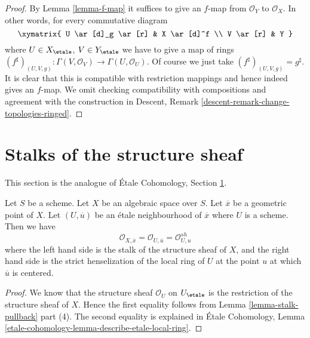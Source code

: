 \begin{proof}
By Lemma \ref{lemma-f-map} it suffices to give an $f$-map from
$\mathcal{O}_Y$ to $\mathcal{O}_X$. In other words, for every
commutative diagram
$$
\xymatrix{
U \ar[d]_g \ar[r] & X \ar[d]^f \\
V \ar[r] & Y
}
$$
where $U \in X_\etale$, $V \in Y_\etale$ we have to give a
map of rings
$
(f^\sharp)_{(U, V, g)} :
\Gamma(V, \mathcal{O}_V)
\to
\Gamma(U, \mathcal{O}_U).
$
Of course we just take $(f^\sharp)_{(U, V, g)} = g^\sharp$.
It is clear that this is compatible with restriction mappings
and hence indeed gives an $f$-map.
We omit checking compatibility with compositions and agreement with the
construction in
Descent, Remark \ref{descent-remark-change-topologies-ringed}.
\end{proof}







\section{Stalks of the structure sheaf}
\label{section-stalks-structure-sheaf}

\noindent
This section is the analogue of
\'Etale Cohomology, Section \ref{section-stalks-structure-sheaf}.

\begin{lemma}
\label{lemma-describe-etale-local-ring}
Let $S$ be a scheme.
Let $X$ be an algebraic space over $S$.
Let $\overline{x}$ be a geometric point of $X$.
Let $(U, \overline{u})$ be an \'etale neighbourhood of $\overline{x}$
where $U$ is a scheme. Then we have
$$
\mathcal{O}_{X, \overline{x}} =
\mathcal{O}_{U, \overline{u}} =
\mathcal{O}_{U, u}^{sh}
$$
where the left hand side is the stalk of the structure sheaf of $X$,
and the right hand side is the strict henselization of the local ring
of $U$ at the point $u$ at which $\overline{u}$ is centered.
\end{lemma}

\begin{proof}
We know that the structure sheaf $\mathcal{O}_U$ on
$U_\etale$ is the restriction of the structure sheaf of $X$.
Hence the first equality follows from
Lemma \ref{lemma-stalk-pullback} part (4).
The second equality is explained in
\'Etale Cohomology,
Lemma \ref{etale-cohomology-lemma-describe-etale-local-ring}.
\end{proof}

